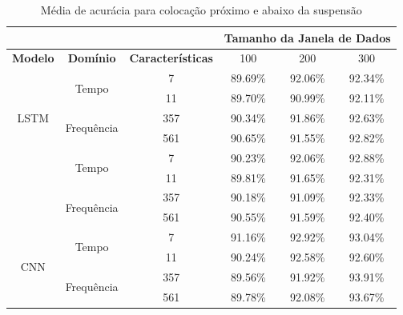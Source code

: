 \begin{table}[h!]
\scriptsize
\centering
\caption{Média de acurácia para colocação próximo e abaixo da suspensão}
\label{table:below_suspension_results_tipo_superficie_2}
\begin{tabular}{cccccc}
\cmidrule(l){4-6} & \multicolumn{1}{l}{\textbf{}} & \multicolumn{1}{l}{} & \multicolumn{3}{c}{\textbf{Tamanho da Janela de Dados}} \\ \midrule
\textbf{Modelo} & \textbf{Domínio} & \textbf{Características} & \multicolumn{1}{c}{100} & \multicolumn{1}{c}{200} & \multicolumn{1}{c}{300} \\ \midrule
\multirow{5}{*}{LSTM} & \multirow{2}{*}{Tempo} 
& 7 & 89.69\% & 92.06\% & 92.34\% \\ \cmidrule(l){3-6} 
&  & 11 & 89.70\% & 90.99\% & 92.11\% \\ \cmidrule(l){2-6} 
& \multirow{2}{*}{Frequência} 
& 357 & 90.34\% & 91.86\% & 92.63\% \\ \cmidrule(l){3-6} 
&  & 561 & 90.65\% & 91.55\% & \cellcolor[HTML]{34FF34}92.82\% \\ \midrule
\multirow{5}{*}{GRU} & \multirow{2}{*}{Tempo} 
& 7 & 90.23\% & 92.06\% & \cellcolor[HTML]{34FF34}92.88\% \\ \cmidrule(l){3-6} 
&  & 11 & 89.81\% & 91.65\% & 92.31\% \\ \cmidrule(l){2-6} 
 & \multirow{2}{*}{Frequência} & 357 & 90.18\% & 91.09\% & 92.33\% \\ \cmidrule(l){3-6} 
 &  & 561 & 90.55\% & 91.59\% & 92.40\% \\ \midrule
\multirow{5}{*}{CNN} & \multirow{2}{*}{Tempo} & 7 & 91.16\% & 92.92\% & 93.04\% \\ \cmidrule(l){3-6} 
 &  & 11 & 90.24\% & 92.58\% & 92.60\% \\ \cmidrule(l){2-6} 
 & \multirow{2}{*}{Frequência} & 357 & 89.56\% & 91.92\% & \cellcolor[HTML]{34FF34}93.91\% \\ \cmidrule(l){3-6} 
 &  & 561 & 89.78\% & 92.08\% & 93.67\% \\ \bottomrule
\end{tabular}
\end{table}

